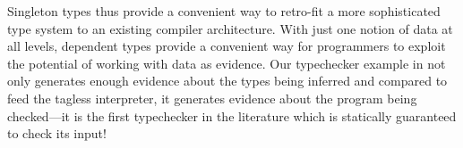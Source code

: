 \documentclass{fundam}
\begin{document}
Singleton types thus provide a convenient way to retro-fit a more
sophisticated type system to an existing compiler architecture.
With just one notion of data at all levels, dependent types
provide a convenient way for programmers to exploit the potential
of working with data as evidence. Our typechecker example in
\cite{ConorJames:vfl} not only generates enough evidence about
the types being inferred and compared to feed the tagless interpreter,
it generates evidence about the program being checked---it is the
first typechecker in the literature which is statically guaranteed to
check its input!







\end{document}
